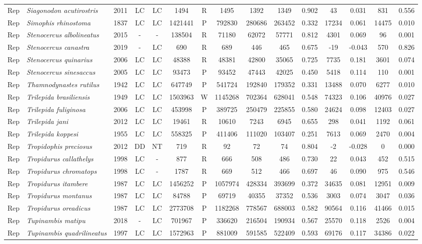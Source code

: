 \documentclass[12pt,openright,oneside,a4paper,english]{abntex2}
\begin{document}
\begin{landscape}
\begin{longtable}{llccccccccccccc}
		Rep&\textit{Siagonodon acutirostris}&2011&LC&LC&1494&R&1495&1392&1349&0.902&43&0.031&831&0.556\\
		Rep&\textit{Simophis rhinostoma}&1837&LC&LC&1421441&P&792830&280686&263452&0.332&17234&0.061&14475&0.010\\
		Rep&\textit{Stenocercus albolineatus}&2015&-&-&138504&R&71180&62072&57771&0.812&4301&0.069&96&0.001\\
		Rep&\textit{Stenocercus canastra}&2019&-&LC&690&R&689&446&465&0.675&-19&-0.043&570&0.826\\
		Rep&\textit{Stenocercus quinarius}&2006&LC&LC&48388&R&48381&42800&35065&0.725&7735&0.181&3601&0.074\\
		Rep&\textit{Stenocercus sinesaccus}&2005&LC&LC&93473&P&93452&47443&42025&0.450&5418&0.114&110&0.001\\
		Rep&\textit{Thamnodynastes rutilus}&1942&LC&LC&647749&P&541724&192840&179352&0.331&13488&0.070&6277&0.010\\
		Rep&\textit{Trilepida brasiliensis}&1949&LC&LC&1503963&W&1145268&702364&628041&0.548&74323&0.106&40976&0.027\\
		Rep&\textit{Trilepida fuliginosa}&2006&LC&LC&453998&P&389725&250479&225855&0.580&24624&0.098&12403&0.027\\
		Rep&\textit{Trilepida jani}&2012&LC&LC&19461&R&10610&7243&6945&0.655&298&0.041&1192&0.061\\
		Rep&\textit{Trilepida koppesi}&1955&LC&LC&558325&P&411406&111020&103407&0.251&7613&0.069&2470&0.004\\
		Rep&\textit{Tropidophis preciosus}&2012&DD&NT&719&R&92&72&74&0.804&-2&-0.028&0&0.000\\
		Rep&\textit{Tropidurus callathelys}&1998&LC&-&877&R&666&508&486&0.730&22&0.043&452&0.515\\
		Rep&\textit{Tropidurus chromatops}&1998&LC&-&1787&R&669&512&466&0.697&46&0.090&975&0.546\\
		Rep&\textit{Tropidurus itambere}&1987&LC&LC&1456252&P&1057974&428334&393699&0.372&34635&0.081&12951&0.009\\
		Rep&\textit{Tropidurus montanus}&1987&LC&LC&84788&P&69719&40355&37352&0.536&3003&0.074&3047&0.036\\
		Rep&\textit{Tropidurus oreadicus}&1987&LC&LC&2773708&P&1182268&778567&688003&0.582&90564&0.116&41466&0.015\\
		Rep&\textit{Tupinambis matipu}&2018&-&LC&701967&P&336620&216504&190934&0.567&25570&0.118&2526&0.004\\
		Rep&\textit{Tupinambis quadrilineatus}&1997&LC&LC&1572963&P&881009&591585&522409&0.593&69176&0.117&34386&0.022\\

\end{longtable}
\end{landscape}
\end{document}
